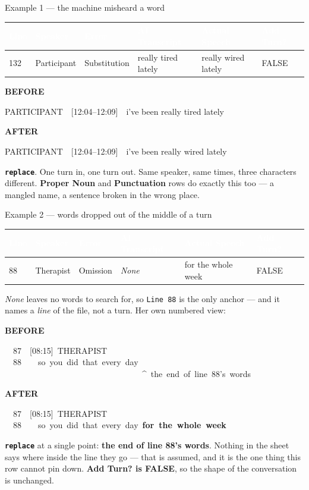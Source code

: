 \documentclass[aspectratio=169]{beamer}
\newcommand{\keybox}[1]{%
  \par\vspace{4pt}\begingroup\centering
  \colorbox{warmbg}{\parbox{0.93\textwidth}{\centering #1}}%
  \par\endgroup\vspace{2pt}}
\newcommand{\sheetrow}[6]{%
  \par\vspace{3pt}\begingroup\centering\footnotesize
  \renewcommand{\arraystretch}{1.3}\setlength{\tabcolsep}{5pt}%
  \begin{tabular}{|>{\raggedright\arraybackslash}p{0.6cm}|>{\raggedright\arraybackslash}p{1.6cm}|>{\raggedright\arraybackslash}p{2.4cm}|>{\raggedright\arraybackslash}p{2.9cm}|>{\raggedright\arraybackslash}p{2.9cm}|>{\raggedright\arraybackslash}p{1.0cm}|}
  \hline
  \rowcolor{hdr}
  \textcolor{white}{\textbf{Line}} & \textcolor{white}{\textbf{Speaker}} &
  \textcolor{white}{\textbf{Error}} & \textcolor{white}{\textbf{AI Transcript}} &
  \textcolor{white}{\textbf{Actual Speech}} & \textcolor{white}{\textbf{Add Turn?}} \\
  \hline
  \rowcolor{warmbg}
  #1 & #2 & #3 & #4 & #5 & #6 \\
  \hline
  \end{tabular}\par\endgroup\vspace{4pt}}
\newcommand{\before}[1]{%
  \par\vspace{3pt}\begingroup\centering
  {\footnotesize\textcolor{soft}{\textbf{BEFORE}}}\par\vspace{1pt}
  \colorbox{coolbg}{\parbox{0.90\textwidth}{\ttfamily\footnotesize #1}}%
  \par\endgroup\vspace{3pt}}
\newcommand{\after}[1]{%
  \par\vspace{2pt}\begingroup\centering
  {\footnotesize\textcolor{good}{\textbf{AFTER}}}\par\vspace{1pt}
  \colorbox{band}{\parbox{0.90\textwidth}{\ttfamily\footnotesize #1}}%
  \par\endgroup\vspace{3pt}}
\newcommand{\opn}[1]{\textcolor{warm}{\textbf{\texttt{#1}}}}
\begin{document}
\begin{frame}{Example 1 --- the machine misheard a word}

\sheetrow{132}{Participant}{Substitution}{really tired lately}{really wired lately}{FALSE}

\before{PARTICIPANT~~[12:04--12:09]~~i've been really tired lately}

\after{PARTICIPANT~~[12:04--12:09]~~i've been really wired lately}

\keybox{\opn{replace}. One turn in, one turn out. Same speaker, same times, three
characters different. \textbf{Proper Noun} and \textbf{Punctuation} rows do exactly this
too --- a mangled name, a sentence broken in the wrong place.}

\end{frame}

\begin{frame}{Example 2 --- words dropped out of the middle of a turn}

\sheetrow{88}{Therapist}{Omission}{\textit{None}}{for the whole week}{FALSE}

{\footnotesize \textit{None} leaves no words to search for, so \texttt{Line 88} is the
only anchor --- and it names a \emph{line} of the file, not a turn. Her own numbered view:}

\before{~~87~~[08:15]~THERAPIST\\
~~88~~~~so~you~did~that~every~day\\
\textcolor{warm}{~~~~~~~~~~~~~~~~~~~~~~~~~~~~~~~~~\textasciicircum{}~the~end~of~line~88's~words}}

\after{~~87~~[08:15]~THERAPIST\\
~~88~~~~so~you~did~that~every~day~\textbf{for~the~whole~week}}

\keybox{\opn{replace} at a single point: \textbf{the end of line 88's words}. Nothing in the
sheet says where inside the line they go --- that is assumed, and it is the one thing this
row cannot pin down. \textbf{Add Turn? is FALSE}, so the shape of the conversation is
unchanged.}

\end{frame}
\end{document}
